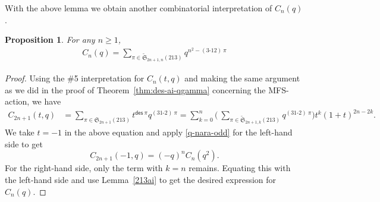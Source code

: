 \documentclass[12pt,reqno]{amsart}
\numberwithin{equation}{section}
\theoremstyle{plain}
\newtheorem{lemma}[theorem]{Lemma}
\newtheorem{proposition}[theorem]{Proposition}
\theoremstyle{definition}
\def\S{\mathfrak{S}}
\def\ai{\mathsf{adi}}
\def\des{\mathsf{des}}
\begin{document}
With the above lemma we obtain another combinatorial interpretation of $C_{n}(q)$.

\begin{proposition}
For any $n\geq 1$,
\begin{align*}
C_{n}(q)=\sum_{\pi\in\widetilde{\S}_{2n+1, n}(213)}q^{n^2-(3\text{-}12)\:\pi}
\end{align*}
\end{proposition}

\begin{proof}
Using the \#5 interpretation for $C_n(t,q)$ and making the same argument as we did in the proof of Theorem~\ref{thm:des-ai-qgamma} concerning the MFS-action, we have
\begin{align*}
C_{2n+1}(t,q)&=\sum_{\pi\in\S_{2n+1}(213)}t^{\des\:\pi}q^{(31\text{-}2)\:\pi}
=\sum_{k=0}^{n}\biggl(\:\sum_{\pi\in\widetilde{\S}_{2n+1,k}(213)}q^{(31\text{-}2)\:\pi}\biggr)t^k(1+t)^{2n-2k}.
\end{align*}
We take $t=-1$ in the above equation and apply \eqref{q-nara-odd} for the left-hand side to get
$$
C_{2n+1}(-1,q)=(-q)^nC_{n}(q^2).
$$
For the right-hand side, only the term with $k=n$ remains. Equating this with the left-hand side and use Lemma~\ref{213ai} to get the desired expression for $C_n(q)$.
\end{proof}



\end{document}

